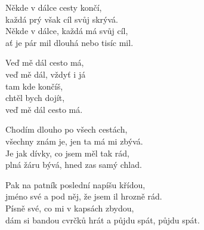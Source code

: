 
\ve{}
Někde v dálce cesty končí,\\
každá prý však cíl svůj skrývá.\\
Někde v dálce, každá má svůj cíl,\\
ať je pár mil dlouhá nebo tisíc mil.

\cho{}
Veď mě dál cesto má, \\
veď mě dál, vždyť i já\\
tam kde končíš,\\
chtěl bych dojít,\\
veď mě dál cesto má.

\ve{}
Chodím dlouho po všech cestách,\\
všechny znám je, jen ta má mi zbývá.\\
Je jak dívky, co jsem měl tak rád,\\
plná žáru bývá, hned zas samý chlad.

\cho{}

\re{*}
Pak na patník poslední napíšu křídou,\\
jméno své a pod něj, že jsem il hrozně rád.\\
Písně své, co mi v kapsách zbydou,\\
dám si bandou cvrčků hrát a půjdu spát, půjdu spát.



\esong
